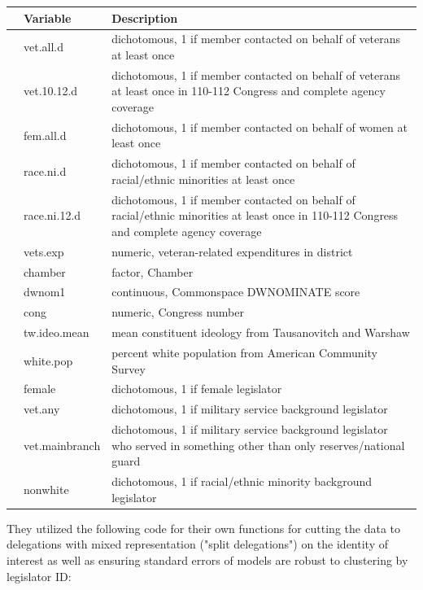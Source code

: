 \documentclass[12pt,letterpaper]{article}
\begin{document}
\begin{table}[ht]
	\centering
	\begin{tabular}{r p{3.5cm} p{10cm}}
		\toprule
		& Variable & Description \\ 
		\midrule
		& vet.all.d & dichotomous, 1 if member contacted on behalf of veterans at least once \\ 
		& vet.10.12.d & dichotomous, 1 if member contacted on behalf of veterans at least once in 110-112 Congress and complete agency coverage \\ 
		 & fem.all.d & dichotomous, 1 if member contacted on behalf of women at least once \\ 
		 & race.ni.d & dichotomous, 1 if member contacted on behalf of
		racial/ethnic minorities at least once \\ 
		& race.ni.12.d & dichotomous, 1 if member contacted on behalf of racial/ethnic minorities at least once in 110-112 Congress and complete agency coverage \\
		\addlinespace[0.8em]
		\hline
		 & vets.exp & numeric, veteran-related expenditures in district \\ 
		 & chamber & factor, Chamber \\ 
		 & dwnom1 & continuous, Commonspace DWNOMINATE score \\ 
		& cong & numeric, Congress number \\ 
		 & tw.ideo.mean & mean constituent ideology from Tausanovitch and Warshaw \\ 
		 & white.pop & percent white population from American Community Survey \\ 
		\addlinespace[0.8em]
		\hline
		 & female & dichotomous, 1 if female legislator \\ 
		 & vet.any & dichotomous, 1 if military service background legislator \\ 
		 & vet.mainbranch & dichotomous, 1 if military service background legislator who served in something other than only reserves/national guard \\ 
		& nonwhite & dichotomous, 1 if racial/ethnic minority background legislator \\ 
		\bottomrule
	\end{tabular}
\end{table}

They utilized the following code for their own functions for cutting the data to delegations with mixed representation ("split delegations") on the identity of interest as well as ensuring standard errors of models are robust to clustering by legislator ID:\\
\end{document}
